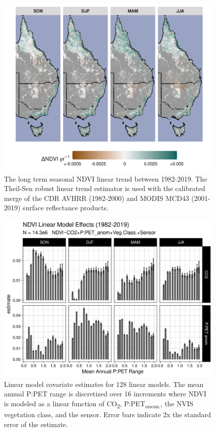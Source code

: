 \documentclass[gc, manuscript]{copernicus}
\begin{document}
\clearpage
\begin{figure}
\includegraphics[width=14cm]{../../figures/appendix-A/SM_Fig3_ndvi_f_of_timeANDsensor_seasonal_longterm_ThielSen_Trend_1982_2019_2021-02-28} \caption{The long term seasonal NDVI linear trend between 1982-2019. The Theil-Sen robust linear trend estimator is used with the calibrated merge of the CDR AVHRR (1982-2000) and MODIS MCD43 (2001-2019) surface reflectance products.}\label{fig:FigA3}
\end{figure}
\clearpage

\clearpage
\begin{figure}
\includegraphics[width=14cm]{../../figures/appendix-A/SM_Fig4_big_linearModel_by_MAPPET_range} \caption{Linear model covariate estimates for 128 linear models. The mean annual P:PET range is discretized over 16 increments where NDVI is modeled as a linear function of CO\textsubscript{2}, P:PET\textsubscript{anom.}, the NVIS vegetation class, and the sensor. Error bars indicate 2x the standard error of the estimate.}\label{fig:FigA4}
\end{figure}
\clearpage
\end{document}
